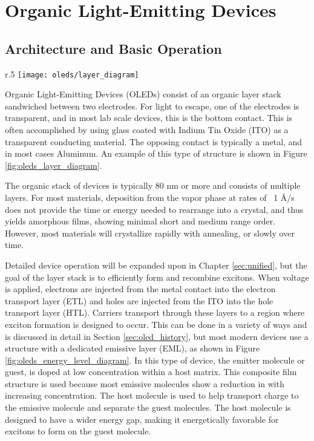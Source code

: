 \documentclass[../thesis.tex]{subfiles}
\begin{document}
\chapter{Organic Light-Emitting Devices}\label{sec:oleds}

\section{Architecture and Basic Operation} \label{sec:oled_operation}

\begin{wrapfigure}{r}{.5\textwidth}
\centering
\texttt{[image: oleds/layer\_diagram]}
\caption{Basic layer diagram for OLED devices.}
\label{fig:oleds_layer_diagram}
\end{wrapfigure}

Organic Light-Emitting Devices (OLEDs) consist of an organic layer stack sandwiched between two electrodes.
For light to escape, one of the electrodes is transparent, and in most lab scale devices, this is the bottom contact.
This is often accomplished by using glass coated with Indium Tin Oxide (ITO) as a transparent conducting material.
The opposing contact is typically a metal, and in most cases Aluminum.
An example of this type of structure is shown in Figure \ref{fig:oleds_layer_diagram}.

The organic stack of devices is typically 80 nm or more and consists of multiple layers.
For most materials, deposition from the vapor phase at rates of ~1 \r{A}/s does not provide the time or energy needed to rearrange into a crystal, and thus yields amorphous films, showing minimal short and medium range order.\supercite{Tao2011,Shirota2007,Kafer2005,Maldonis2017,Maldonis2015,Zhang2017,Zhang2016a}
However, most materials will crystallize rapidly with annealing,\supercite{Fielitz2016} or slowly over time.\supercite{Scholz2015}

Detailed device operation will be expanded upon in Chapter \ref{sec:unified}, but the goal of the layer stack is to efficiently form and recombine excitons.
When voltage is applied, electrons are injected from the metal contact into the electron transport layer (ETL) and holes are injected from the ITO into the hole transport layer (HTL).
Carriers transport through these layers to a region where exciton formation is designed to occur.  
This can be done in a variety of ways and is discussed in detail in Section \ref{sec:oled_history}, but most modern devices use a structure with a dedicated emissive layer (EML), as shown in Figure \ref{fig:oleds_energy_level_diagram}.
In this type of device, the emitter molecule or guest, is doped at low concentration within a host matrix.\supercite{Baldo2000}
This composite film structure is used because most emissive molecules show a reduction in \pl with increasing concentration.\supercite{Turro1991a}
The host molecule is used to help transport charge to the emissive molecule and separate the guest molecules.
The host molecule is designed to have a wider energy gap, making it energetically favorable for excitons to form on the guest molecule.
\end{document}
